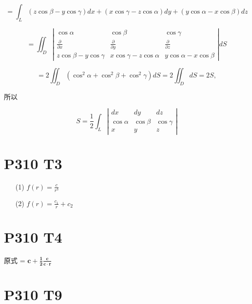 \documentclass{article}
\begin{document}
\[
= \int_L (z \cos \beta - y \cos \gamma) dx + (x \cos \gamma - z \cos \alpha) dy + (y \cos \alpha - x \cos \beta) dz
\]

\[
= \iint_D \left| \begin{array}{ccc}
\cos \alpha & \cos \beta & \cos \gamma \\ 
\frac{\partial}{\partial x} & \frac{\partial}{\partial y} & \frac{\partial}{\partial z} \\ 
z \cos \beta - y \cos \gamma & x \cos \gamma - z \cos \alpha & y \cos \alpha - x \cos \beta 
\end{array} \right| dS
\]

\[
= 2 \iint_D (\cos^2 \alpha + \cos^2 \beta + \cos^2 \gamma) dS = 2 \iint_D dS = 2S,
\]

所以

\[
S = \frac{1}{2} \int_L \left| \begin{array}{ccc}
dx & dy & dz \\ 
\cos \alpha & \cos \beta & \cos \gamma \\ 
x & y & z 
\end{array} \right|
\]

\section*{P310 T3}

\begin{itemize}
    \item [(1)] $f(r) = \frac{c}{r^3}$
    \item [(2)] $f(r) = \frac{c_1}{r} + c_2$
\end{itemize}

\section*{P310 T4}

原式 = $\boldsymbol{c + \frac{1}{2}\frac{\boldsymbol{c}}{\boldsymbol{c}\cdot \boldsymbol{r}}}$

\section*{P310 T9}
\end{document}
